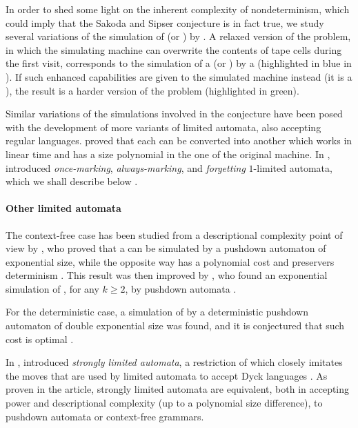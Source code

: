 In order to shed some light on the inherent complexity of nondeterminism, which could imply that the Sakoda and Sipser conjecture is in fact true, we study several variations of the simulation of \TNFA (or \ONFA) by \TDFA.
A relaxed version of the problem, in which the simulating machine can overwrite the contents of tape cells during the first visit, corresponds to the simulation of a \TNFA (or \ONFA) by a \ODLA (highlighted in blue in ).
If such enhanced capabilities are given to the simulated machine instead (\ie it is a \OLA), the result is a harder version of the problem (highlighted in green).

Similar variations of the simulations involved in the conjecture have been posed with the development of more variants of limited automata, also accepting regular languages.
\citeauthor{GuiPri19} proved that each \OLA can be converted into another \OLA which works in linear time \cite{GuiPri19} and has a size polynomial in the one of the original machine.
In \citeyear{PigPri23a}, \citeauthor{PigPri23a} introduced \emph{once-marking}, \emph{always-marking}, and \emph{forgetting} $1$-limited automata, which we shall describe below \cite{PigPri23a,PigPri23}.


\paragraph{Other limited automata}
The context-free case has been studied from a descriptional complexity point of view by \citeauthor{PigPis15}, who proved that a  can be simulated by a pushdown automaton of exponential size, while the opposite way has a polynomial cost and preservers determinism \cite{PigPis15}.
This result was then improved by \citeauthor{KutPig+18}, who found an exponential simulation of \kLAs, for any $k\ge2$, by pushdown automata \cite{KutPig+18}.

For the deterministic case, a simulation of  by a deterministic pushdown automaton of double exponential size was found, and it is conjectured that such cost is optimal \cite{PigPis15}.

In \citeyear{Pig16}, \citeauthor{Pig16} introduced \emph{strongly limited automata}, a restriction of  which closely imitates the moves that are used by limited automata to accept Dyck languages \cite{Pig16}.
As proven in the article, strongly limited automata are equivalent, both in accepting power and descriptional complexity (up to a polynomial size difference), to pushdown automata or context-free grammars.

